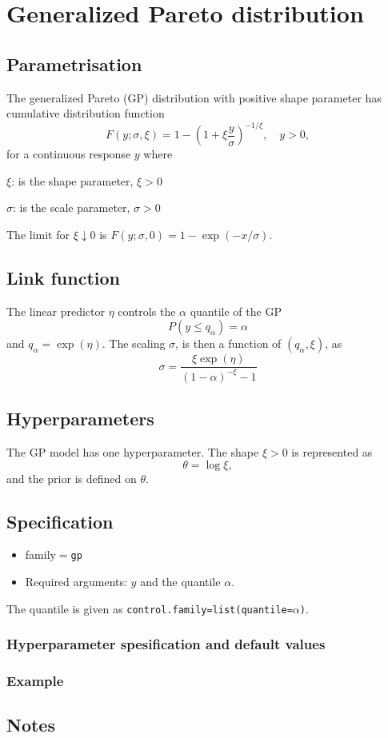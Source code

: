 \documentclass[12pt]{article}
\begin{document}
\section*{Generalized Pareto distribution}
\subsection*{Parametrisation}
The generalized Pareto (GP) distribution with positive shape parameter
has cumulative distribution function
$$
F(y;\sigma,\xi)=1-\left(1+\xi\frac{y}{\sigma}\right)^{-1/\xi},
\quad y>0,
$$
for a continuous response $y$ where
\begin{description}
\item $\xi$: is the shape parameter, $\xi>0$
\item $\sigma$: is the scale parameter, $\sigma>0$
\end{description}
The limit for $\xi\downarrow 0$ is
$F(y;\sigma,0)=1-\exp(-x/\sigma)$.

\subsection*{Link function}

The linear predictor $\eta$ controls the $\alpha$ quantile of
the GP
\begin{displaymath}
    P(y \le q_{\alpha}) = \alpha
\end{displaymath}
and $q_{\alpha} = \exp(\eta)$. The scaling $\sigma$, is then a
function of $(q_{\alpha}, \xi)$, as
\begin{displaymath}
    \sigma = \frac{\xi\exp(\eta)}{(1-\alpha)^{-\xi}-1}
\end{displaymath}

\subsection*{Hyperparameters}
The $\mathrm{GP}$ model has one hyperparameter. The shape $\xi>0$ is
represented as
$$
\theta=\log \xi,
$$
and the prior is defined on $\theta$.

\subsection*{Specification}
\begin{itemize}
\item family$=$\texttt{gp}
\item Required arguments: $y$ and the quantile $\alpha$. 
\end{itemize}
The quantile is given as \texttt{control.family=list(quantile=$\alpha$)}.

\subsubsection*{Hyperparameter spesification and default values}


\subsubsection*{Example}


\subsection*{Notes}
        
\end{document}
